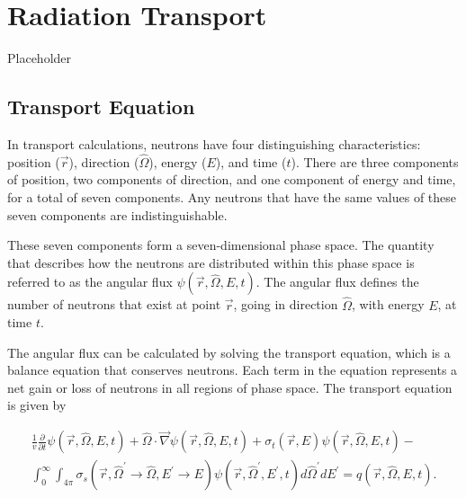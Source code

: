 \section{Radiation Transport}
\label{sec:bg:rt}

Placeholder

\subsection{Transport Equation}
\label{sec:bg:rt:te}

In transport calculations, neutrons have four distinguishing characteristics: position ($\vec{r}$), direction ($\hat{\Omega}$), energy ($E$), and time ($t$).
There are three components of position, two components of direction, and one component of energy and time, for a total of seven components.
Any neutrons that have the same values of these seven components are indistinguishable.

These seven components form a seven-dimensional phase space.
The quantity that describes how the neutrons are distributed within this phase space is referred to as the angular flux $\psi\left(\vec{r},\hat{\Omega},E,t\right)$.
The angular flux defines the number of neutrons that exist at point $\vec{r}$, going in direction ${\hat{\Omega}}$, with energy $E$, at time $t$.

The angular flux can be calculated by solving the transport equation, which is a balance equation that conserves neutrons.
Each term in the equation represents a net gain or loss of neutrons in all regions of phase space.
The transport equation is given by

\begin{multline}\label{eq:bg:rt:transport-timedep}
  \frac{1}{v}\frac{\partial}{\partial t}\psi\left(\vec{r},\hat{\Omega},E,t\right) +
  \hat{\Omega}\cdot\vec{\nabla}\psi\left(\vec{r},\hat{\Omega},E,t\right) +
  \sigma_t\left(\vec{r},E\right)\psi\left(\vec{r},\hat{\Omega},E,t\right) - \\
  \int_0^\infty\int_{4\pi}\sigma_s\left(\vec{r},\hat{\Omega}^\prime\rightarrow\hat{\Omega},E^\prime\rightarrow E\right)\psi\left(\vec{r},\hat{\Omega}^\prime,E^\prime,t\right)d\hat{\Omega}^\prime dE^\prime =
  q\left(\vec{r},\hat{\Omega},E,t\right).
\end{multline}

